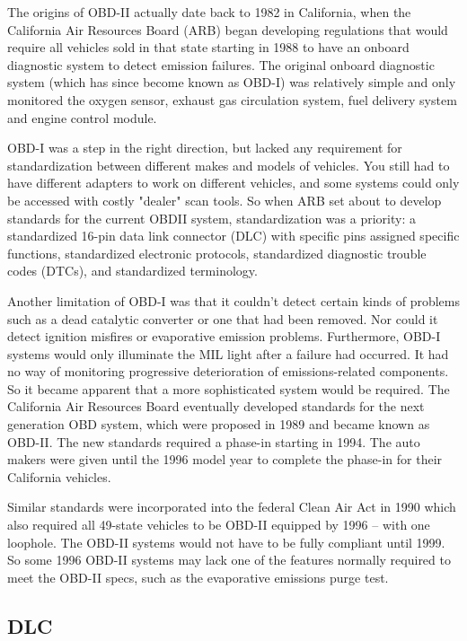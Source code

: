 \begin{displayquote}
	The origins of OBD-II actually date back to 1982 in California, when the California Air Resources Board (ARB) began developing regulations that would require all vehicles sold in that state starting in 1988 to have an onboard diagnostic system to detect emission failures. The original onboard diagnostic system (which has since become known as OBD-I) was relatively simple and only monitored the oxygen sensor, exhaust gas circulation system, fuel delivery system and engine control module.
	
	OBD-I was a step in the right direction, but lacked any requirement for standardization between different makes and models of vehicles. You still had to have different adapters to work on different vehicles, and some systems could only be accessed with costly "dealer" scan tools. So when ARB set about to develop standards for the current OBDII system, standardization was a priority: a standardized 16-pin data link connector (DLC) with specific pins assigned specific functions, standardized electronic protocols, standardized diagnostic trouble codes (DTCs), and standardized terminology.
	
	Another limitation of OBD-I was that it couldn't detect certain kinds of problems such as a dead catalytic converter or one that had been removed. Nor could it detect ignition misfires or evaporative emission problems. Furthermore, OBD-I systems would only illuminate the MIL light after a failure had occurred. It had no way of monitoring progressive deterioration of emissions-related components. So it became apparent that a more sophisticated system would be required. The California Air Resources Board eventually developed standards for the next generation OBD system, which were proposed in 1989 and became known as OBD-II. The new standards required a phase-in starting in 1994. The auto makers were given until the 1996 model year to complete the phase-in for their California vehicles.
	
	Similar standards were incorporated into the federal Clean Air Act in 1990 which also required all 49-state vehicles to be OBD-II equipped by 1996 -- with one loophole. The OBD-II systems would not have to be fully compliant until 1999. So some 1996 OBD-II systems may lack one of the features normally required to meet the OBD-II specs, such as the evaporative emissions purge test.
\end{displayquote}

\subsection{DLC}
\label{subsec:obd:dlc}

